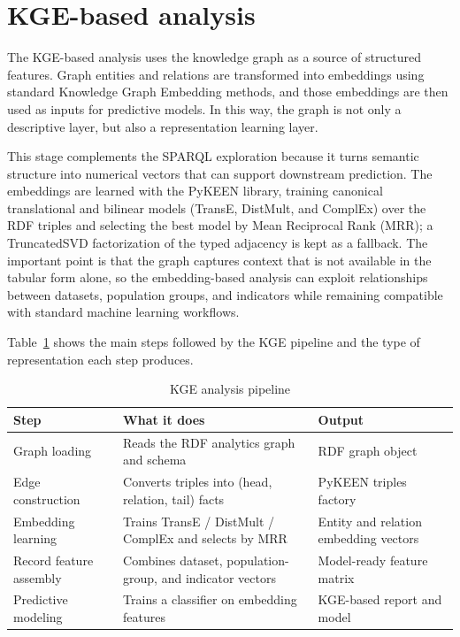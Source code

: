\documentclass[11pt,a4paper]{article}
\begin{document}
\section{KGE-based analysis}
The KGE-based analysis uses the knowledge graph as a source of structured features. Graph entities and relations are transformed into embeddings using standard Knowledge Graph Embedding methods, and those embeddings are then used as inputs for predictive models. In this way, the graph is not only a descriptive layer, but also a representation learning layer.

This stage complements the SPARQL exploration because it turns semantic structure into numerical vectors that can support downstream prediction. The embeddings are learned with the PyKEEN library, training canonical translational and bilinear models (TransE, DistMult, and ComplEx) over the RDF triples and selecting the best model by Mean Reciprocal Rank (MRR); a TruncatedSVD factorization of the typed adjacency is kept as a fallback. The important point is that the graph captures context that is not available in the tabular form alone, so the embedding-based analysis can exploit relationships between datasets, population groups, and indicators while remaining compatible with standard machine learning workflows.

Table~\ref{tab:kge-pipeline} shows the main steps followed by the KGE pipeline and the type of representation each step produces.

\begin{table}[ht]
\centering
\begin{tabular}{|l|p{5.5cm}|p{4.5cm}|}
\hline
\textbf{Step} & \textbf{What it does} & \textbf{Output} \\ \hline
Graph loading & Reads the RDF analytics graph and schema & RDF graph object \\ \hline
Edge construction & Converts triples into (head, relation, tail) facts & PyKEEN triples factory \\ \hline
Embedding learning & Trains TransE / DistMult / ComplEx and selects by MRR & Entity and relation embedding vectors \\ \hline
Record feature assembly & Combines dataset, population-group, and indicator vectors & Model-ready feature matrix \\ \hline
Predictive modeling & Trains a classifier on embedding features & KGE-based report and model \\ \hline
\end{tabular}
\caption{KGE analysis pipeline}
\label{tab:kge-pipeline}
\end{table}
\end{document}
